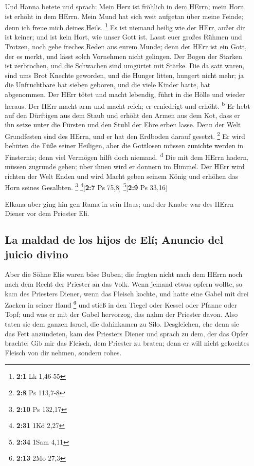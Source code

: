  Und Hanna betete und sprach: Mein Herz ist fröhlich in
dem HErrn; mein Horn ist erhöht in dem HErrn. Mein Mund hat sich weit
aufgetan über meine Feinde; denn ich freue mich deines Heils.
\footnote{\textbf{2:1} Lk 1,46-55}  Es ist niemand heilig
wie der HErr, außer dir ist keiner; und ist kein Hort, wie unser Gott
ist.  Lasst euer großes Rühmen und Trotzen, noch gehe
freches Reden aus eurem Munde; denn der HErr ist ein Gott, der es merkt,
und lässt solch Vornehmen nicht gelingen.  Der Bogen der
Starken ist zerbrochen, und die Schwachen sind umgürtet mit Stärke.
 Die da satt waren, sind ums Brot Knechte geworden, und
die Hunger litten, hungert nicht mehr; ja die Unfruchtbare hat sieben
geboren, und die viele Kinder hatte, hat abgenommen.  Der
HErr tötet und macht lebendig, führt in die Hölle und wieder heraus.
 Der HErr macht arm und macht reich; er erniedrigt und
erhöht. \textsuperscript{b}  Er hebt auf den Dürftigen aus
dem Staub und erhöht den Armen aus dem Kot, dass er ihn setze unter die
Fürsten und den Stuhl der Ehre erben lasse. Denn der Welt Grundfesten
sind des HErrn, und er hat den Erdboden darauf gesetzt. \footnote{\textbf{2:8}
  Ps 113,7-8}  Er wird behüten die Füße seiner Heiligen,
aber die Gottlosen müssen zunichte werden in Finsternis; denn viel
Vermögen hilft doch niemand. \textsuperscript{d}  Die mit
dem HErrn hadern, müssen zugrunde gehen; über ihnen wird er donnern im
Himmel. Der HErr wird richten der Welt Enden und wird Macht geben seinem
König und erhöhen das Horn seines Gesalbten. \footnote{\textbf{2:10} Ps
  132,17} \footnote{\textbf{2:31} 1Kö 2,27}{[}\textbf{2:7} Ps 75,8{]}
\footnote{\textbf{2:34} 1Sam 4,11}{[}\textbf{2:9} Ps 33,16{]}

 Elkana aber ging hin gen Rama in sein Haus; und der
Knabe war des HErrn Diener vor dem Priester Eli.

\hypertarget{la-maldad-de-los-hijos-de-eluxed-anuncio-del-juicio-divino}{%
\subsection{La maldad de los hijos de Elí; Anuncio del juicio
divino}\label{la-maldad-de-los-hijos-de-eluxed-anuncio-del-juicio-divino}}

 Aber die Söhne Elis waren böse Buben; die fragten nicht
nach dem HErrn  noch nach dem Recht der Priester an das
Volk. Wenn jemand etwas opfern wollte, so kam des Priesters Diener, wenn
das Fleisch kochte, und hatte eine Gabel mit drei Zacken in seiner Hand
\footnote{\textbf{2:13} 2Mo 27,3}  und stieß in den
Tiegel oder Kessel oder Pfanne oder Topf; und was er mit der Gabel
hervorzog, das nahm der Priester davon. Also taten sie dem ganzen
Israel, die dahinkamen zu Silo.  Desgleichen, ehe denn
sie das Fett anzündeten, kam des Priesters Diener und sprach zu dem, der
das Opfer brachte: Gib mir das Fleisch, dem Priester zu braten; denn er
will nicht gekochtes Fleisch von dir nehmen, sondern rohes.

